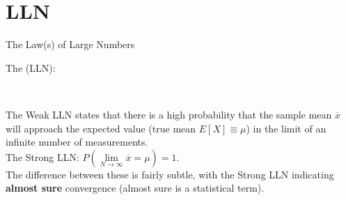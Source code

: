 \documentclass[10pt,sans,english,compress,xcolor=dvipsnames]{beamer}
\begin{document}

\section{LLN}

\begin{frame}{The Law(s) of Large Numbers}
\small

The  (LLN):\\
\begin{center}
\\[1ex]
\end{center}
The Weak LLN states that there is a high probability that the sample mean $\overline{x}$ will approach the expected value (true mean $E[X] \equiv \mu$)  in the limit of an infinite number of measurements. \\

The Strong LLN: $P(\lim\limits_{N\to \infty} \overline{x} = \mu) =1$.\\

The difference between these is fairly subtle, with the Strong LLN indicating \textbf{almost sure} convergence (almost sure is a statistical term).\\

\end{frame}
\end{document}
